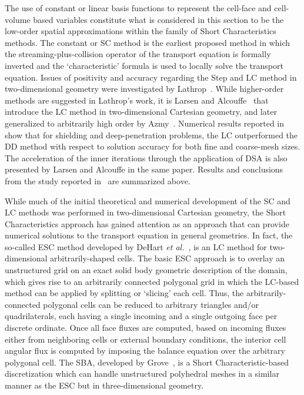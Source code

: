 The use of constant or linear basis functions to represent the cell-face and cell-volume based variables constitute what is considered in this section to be the low-order spatial approximations within the family of Short Characteristics methods.
The constant or \ac{SC} method is the earliest proposed method in which the streaming-plus-collision operator of the transport equation is formally inverted and the `characteristic' formula is used to locally solve the transport equation.
Issues of positivity and accuracy regarding the Step and \ac{LC} method in two-dimensional geometry were investigated by Lathrop~\cite{Lathrop1969}.
While higher-order methods are suggested in Lathrop's work, it is Larsen and Alcouffe~\cite{Larsen1981} that introduce the \ac{LC} method in two-dimensional Cartesian geometry, and later generalized to arbitrarily high order by Azmy~\cite{Azmy1992}.
Numerical results reported in~\cite{Larsen1981} show that for shielding and deep-penetration problems, the \ac{LC} outperformed the DD method with respect to solution accuracy for both fine and coarse-mesh sizes.
The acceleration of the inner iterations through the application of DSA is also presented by Larsen and Alcouffe in the same paper.
Results and conclusions from the study reported in~\cite{Azmy1992} are summarized above.

While much of the initial theoretical and numerical development of the \ac{SC} and \ac{LC} methods was performed in two-dimensional Cartesian geometry, the Short Characteristics approach has gained attention as an approach that can provide numerical solutions to the transport equation in general geometries.
In fact, the so-called \ac{ESC} method developed by DeHart \textit{et al.}~\cite{DeHart1994}, is an \ac{LC} method for two-dimensional arbitrarily-shaped cells.
The basic \ac{ESC} approach is to overlay an unstructured grid on an exact solid body geometric description of the domain, which gives rise to an arbitrarily connected polygonal grid in which the \ac{LC}-based method can be applied by splitting or `slicing' each cell.
Thus, the arbitrarily-connected polygonal cells can be reduced to arbitrary triangles and/or quadrilaterals, each having a single incoming and a single outgoing face per discrete ordinate.
Once all face fluxes are computed, based on incoming fluxes either from neighboring cells or external boundary conditions, the interior cell angular flux is computed by imposing the balance equation over the arbitrary polygonal cell.
The \ac{SBA}, developed by Grove~\cite{Grove2005}, is a Short Characteristic-based discretization which can handle unstructured polyhedral meshes in a similar manner as the \ac{ESC} but in three-dimensional geometry.

